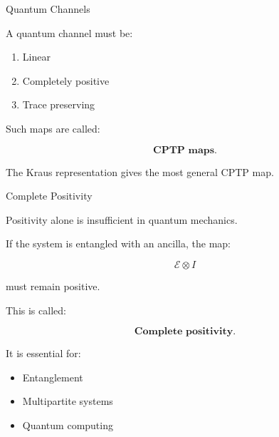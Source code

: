 \documentclass{beamer}
\begin{document}
\begin{frame}{Quantum Channels}

A quantum channel must be:

\begin{enumerate}
    \item Linear
    \item Completely positive
    \item Trace preserving
\end{enumerate}

\vspace{0.4cm}

Such maps are called:

\[
\textbf{CPTP maps}.
\]

\vspace{0.4cm}

The Kraus representation gives the most general CPTP map.

\end{frame}

\begin{frame}{Complete Positivity}

Positivity alone is insufficient in quantum mechanics.

\vspace{0.4cm}

If the system is entangled with an ancilla,
the map:

\[
\mathcal{E}\otimes I
\]

must remain positive.

\vspace{0.4cm}

This is called:

\[
\textbf{Complete positivity}.
\]

\vspace{0.4cm}

It is essential for:
\begin{itemize}
    \item Entanglement
    \item Multipartite systems
    \item Quantum computing
\end{itemize}

\end{frame}
\end{document}
